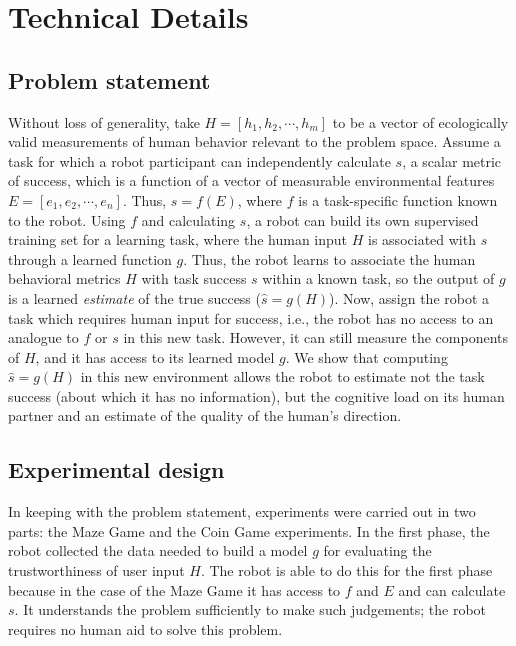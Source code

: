 \documentclass{sig-alternate}
\begin{document}
\section{Technical Details}
\subsection{Problem statement}
Without loss of generality, take $H=[h_1,h_2,\cdots,h_m]$ to be a
vector of ecologically valid measurements of human behavior relevant to
the problem space.  Assume a task for which a robot participant can
independently calculate $s$, a scalar metric of success, which is a
function of a vector of measurable environmental features
$E=[e_1,e_2,\cdots,e_n]$.  Thus, $s = f(E)$, where $f$ is a
task-specific function known to the robot.  Using $f$ and calculating
$s$, a robot can build its own supervised training set for a learning
task, where the human input $H$ is associated with $s$ through a
learned function $g$.  Thus, the robot learns to associate the human
behavioral metrics $H$ with task success $s$ within a known task, so
the output of $g$ is a learned \emph{estimate} of the true success
($\hat{s}=g(H)$).  Now, assign the robot a task which requires human
input for success, i.e., the robot has no access to an analogue to $f$
or $s$ in this new task.  However, it can still measure the components
of $H$, and it has access to its learned model $g$.  We show that
computing $\hat{s}=g(H)$ in this new environment allows the robot to
estimate not the task success (about which it has no information), but
the cognitive load on its human partner and an estimate of the quality
of the human's direction.
\subsection{Experimental design}
In keeping with the problem statement, experiments were carried out in
two parts: the Maze Game and the Coin Game experiments. In the first
phase, the robot collected the data needed to build a model $g$ for
evaluating the trustworthiness of user input $H$. The robot is able to
do this for the first phase because in the case of the Maze Game it
has access to $f$ and $E$ and can calculate $s$.  It understands the
problem sufficiently to make such judgements; the robot requires no
human aid to solve this problem.

\end{document}
